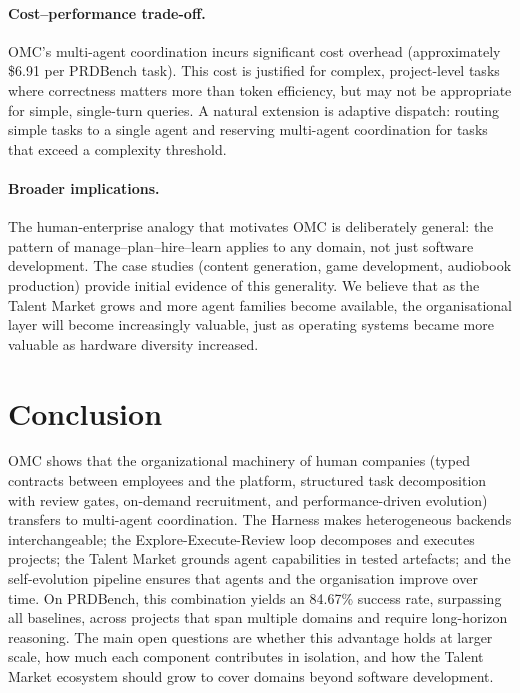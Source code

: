 \documentclass[11pt,a4paper]{article}
\begin{document}
\paragraph{Cost--performance trade-off.}
OMC's multi-agent coordination incurs significant cost overhead (approximately \$6.91 per PRDBench task).  This cost is justified for complex, project-level tasks where correctness matters more than token efficiency, but may not be appropriate for simple, single-turn queries.  A natural extension is adaptive dispatch: routing simple tasks to a single agent and reserving multi-agent coordination for tasks that exceed a complexity threshold.

\paragraph{Broader implications.}
The human-enterprise analogy that motivates OMC is deliberately general: the pattern of manage--plan--hire--learn applies to any domain, not just software development.  The case studies (content generation, game development, audiobook production) provide initial evidence of this generality.  We believe that as the Talent Market grows and more agent families become available, the organisational layer will become increasingly valuable, just as operating systems became more valuable as hardware diversity increased.


\section{Conclusion}
\label{sec:conclusion}

OMC shows that the organizational machinery of human companies (typed contracts between employees and the platform, structured task decomposition with review gates, on-demand recruitment, and performance-driven evolution) transfers to multi-agent coordination.  The Harness makes heterogeneous backends interchangeable; the Explore-Execute-Review loop decomposes and executes projects; the Talent Market grounds agent capabilities in tested artefacts; and the self-evolution pipeline ensures that agents and the organisation improve over time.  On PRDBench, this combination yields an 84.67\% success rate, surpassing all baselines, across projects that span multiple domains and require long-horizon reasoning.  The main open questions are whether this advantage holds at larger scale, how much each component contributes in isolation, and how the Talent Market ecosystem should grow to cover domains beyond software development.

\clearpage


\clearpage

\end{document}
